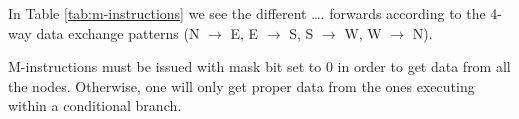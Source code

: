

In Table \ref{tab:m-instructions} we see the different  \ldots.  forwards according to the 4-way data
exchange patterns (N $\rightarrow$ E, E $\rightarrow$ S, S $\rightarrow$ W, W
$\rightarrow$ N).

M-instructions must be issued with mask bit set to 0 in order to get data from
all the nodes. Otherwise, one will only get proper data from the ones executing
within a conditional branch. 

